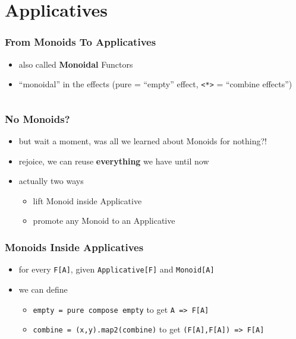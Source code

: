 \documentclass[aspectratio=169]{beamer}
\begin{document}
\section{Applicatives}\label{sec:applicatives}

\begin{frame}[fragile]
  \frametitle{From Monoids To Applicatives}
  \begin{itemize}
  \item also called \textbf{Monoidal} Functors
  \item ``monoidal'' in the effects (pure = ``empty'' effect, \texttt{<*>} = ``combine effects'')
  \end{itemize}
  \vfill
  \inputminted[fontsize=\small]{scala}{snippets/applicative-def.scala}
\end{frame}

\begin{frame}
  \frametitle{No Monoids?}
  \begin{itemize}
  \item but wait a moment, was all we learned about Monoids for nothing?!
  \item rejoice, we can reuse \textbf{everything} we have until now
  \item actually two ways
    \begin{itemize}
    \item lift Monoid inside Applicative
    \item promote any Monoid to an Applicative
    \end{itemize}
  \end{itemize}
\end{frame}

\begin{frame}
  \frametitle{Monoids Inside Applicatives}
  \begin{itemize}
  \item for every \texttt{F[A]}, given \texttt{Applicative[F]} and \texttt{Monoid[A]}
  \item we can define
    \begin{itemize}
    \item \texttt{empty = pure compose empty} to get \texttt{A => F[A]}
    \item \texttt{combine = (x,y).map2(combine)} to get \texttt{(F[A],F[A]) => F[A]}
    \end{itemize}
  \end{itemize}
\end{frame}
\end{document}
